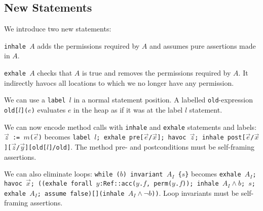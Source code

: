 \subsection{New Statements}
\begin{mytitle} We introduce two new statements:
    \begin{mysubtitle} \texttt{inhale $A$} adds the permissions required by $A$ and assumes pure assertions made in $A$.
    \end{mysubtitle}
    \begin{mysubtitle} \texttt{exhale $A$} checks that $A$ is true and removes the permissions required by $A$. It indirectly havocs all locations to which we no longer have any permission.
    \end{mysubtitle}
\end{mytitle}
\begin{mytitle} We can use a \texttt{label $l$} in a normal statement position. A labelled \texttt{old}-expression \texttt{old[$l$]($e$)} evaluates $e$ in the heap as if it was at the label $l$ statement.
\end{mytitle}
\begin{mytitle} We can now encode method calls with \texttt{inhale} and \texttt{exhale} statements and labels: \texttt{$\vec{z}$ := $m$($\vec{e}$)} becomes \texttt{label $l$; exhale pre[$\vec{e}$/$\vec{x}$]; havoc $\vec{z}$; inhale post[$\vec{e}$/$\vec{x}$][$\vec{z}$/$\vec{y}$][old[$l$]/old]}. The method pre- and postconditions must be self-framing assertions.
\end{mytitle}
\begin{mytitle} We can also eliminate loops: \texttt{while ($b$) invariant $A_I$ \{$s$\}} becomes \texttt{exhale $A_I$; havoc $\vec{x}$; ((exhale forall $y$:Ref::acc($y$.$f$, perm($y$.$f$)); inhale $A_I\land b$; $s$; exhale $A_I$; assume false)[](inhale $A_I\land \lnot b$))}. Loop invariants must be self-framing assertions.
\end{mytitle}
